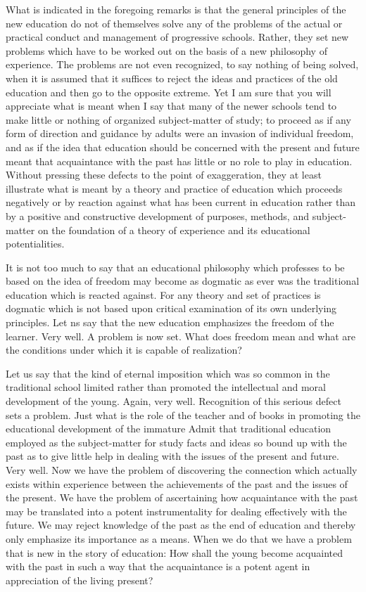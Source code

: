 What is indicated in the foregoing remarks is that the general principles of the new 
education do not of themselves solve any of the problems of the actual or practical 
conduct and management of progressive schools. Rather, they set new problems which 
have to be worked out on the basis of a new philosophy of experience. The problems are 
not even recognized, to say nothing of being solved, when it is assumed that it suffices to 
reject the ideas and practices of the old education and then go to the opposite extreme. 
Yet I am sure that you will appreciate what is meant when I say that many of the newer 
schools tend to make little or nothing of organized subject-matter of study; to proceed as 
if any form of direction and guidance by adults were an invasion of individual freedom, 
and as if the idea that education should be concerned with the present and future meant 
that acquaintance with the past has little or no role to play in education. Without pressing 
these defects to the point of exaggeration, they at least illustrate what is meant by a 
theory and practice of education which proceeds negatively or by reaction against what 
has been current in education rather than by a positive and constructive development of 
purposes, methods, and subject-matter on the foundation of a theory of experience and its 
educational potentialities. 

It is not too much to say that an educational philosophy which professes to be based 
on the idea of freedom may become as dogmatic as ever was the traditional education 
which is reacted against. For any theory and set of practices is dogmatic which is not 
based upon critical examination of its own underlying principles. Let ns say that the new 
education emphasizes the freedom of the learner. Very well. A problem is now set. What 
does freedom mean and what are the conditions under which it is capable of realization? 



Let us say that the kind of eternal imposition which was so common in the traditional 
school limited rather than promoted the intellectual and moral development of the young. 
Again, very well. Recognition of this serious defect sets a problem. Just what is the role 
of the teacher and of books in promoting the educational development of the immature 
Admit that traditional education employed as the subject-matter for study facts and ideas 
so bound up with the past as to give little help in dealing with the issues of the present 
and future. Very well. Now we have the problem of discovering the connection which 
actually exists within experience between the achievements of the past and the issues of 
the present. We have the problem of ascertaining how acquaintance with the past may be 
translated into a potent instrumentality for dealing effectively with the future. We may 
reject knowledge of the past as the end of education and thereby only emphasize its 
importance as a means. When we do that we have a problem that is new in the story of 
education: How shall the young become acquainted with the past in such a way that the 
acquaintance is a potent agent in appreciation of the living present? 


